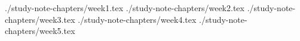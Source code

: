 \documentclass[10pt,a4paper,oneside]{report}
\begin{document}
\maketitle

\setcounter{tocdepth}{5}
\tableofcontents

 {./study-note-chapters/week1.tex}
 {./study-note-chapters/week2.tex}
 {./study-note-chapters/week3.tex}
 {./study-note-chapters/week4.tex}
 {./study-note-chapters/week5.tex}
\end{document}
